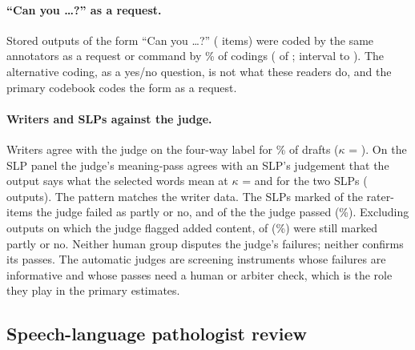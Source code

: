 \paragraph{``Can you \dots?'' as a request.}
Stored outputs of the form ``Can you \dots?'' (\jmpOneNineCanYouItems{} items) were coded by the same annotators as a request or command by \jmpOneNineCanYouRequest{}\% of codings (\jmpOneNineCanYouK{} of \jmpOneNineCanYouN{}; interval \jmpOneNineCanYouRequestLo{} to \jmpOneNineCanYouRequestHi{}).
The alternative coding, as a yes/no question, is not what these readers do, and the primary codebook codes the form as a request.

\paragraph{Writers and SLPs against the judge.}
Writers agree with the judge on the four-way label for \jmpOneEightAgreeFour{}\% of drafts ($\kappa$ = \jmpOneEightKappa{}).
On the SLP panel the judge's meaning-pass agrees with an SLP's judgement that the output says what the selected words mean at $\kappa$ = \jmslpJudgeKappaOne{} and \jmslpJudgeKappaTwo{} for the two SLPs (\jmslpItemsRated{} outputs).
The pattern matches the writer data.
The SLPs marked \jmwmSlpFailK{} of the \jmwmSlpFailN{} rater-items the judge failed as partly or no, and \jmwmSlpPassPartlyK{} of the \jmwmSlpPassN{} the judge passed (\jmwmSlpPassPartly{}\%).
Excluding outputs on which the judge flagged added content, \jmwmSlpPassNoAddK{} of \jmwmSlpPassNoAddN{} (\jmwmSlpPassNoAdd{}\%) were still marked partly or no.
Neither human group disputes the judge's failures; neither confirms its passes.
The automatic judges are screening instruments whose failures are informative and whose passes need a human or arbiter check, which is the role they play in the primary estimates.

\subsection{Speech-language pathologist review}\label{sec:slp}

